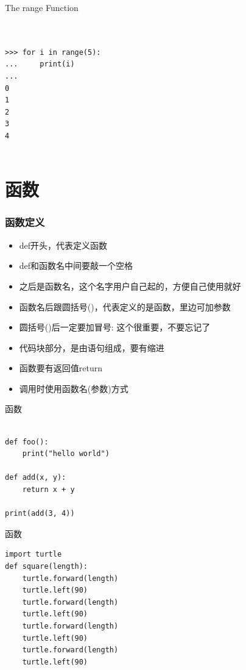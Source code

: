 \documentclass{beamer}
\begin{document}
\begin{frame}[t,fragile]{The range Function}


\begin{verbatim}


>>> for i in range(5):
...     print(i)
...
0
1
2
3
4


\end{verbatim}


\end{frame}

\section{函数} %
\label{sec:函数}

\begin{frame}
  \frametitle{函数定义}
	\begin{itemize}
		\item def开头，代表定义函数
		\item def和函数名中间要敲一个空格
		\item 之后是函数名，这个名字用户自己起的，方便自己使用就好
		\item 函数名后跟圆括号()，代表定义的是函数，里边可加参数
		\item 圆括号()后一定要加冒号: 这个很重要，不要忘记了
		\item 代码块部分，是由语句组成，要有缩进
		\item 函数要有返回值return
		\item 调用时使用函数名(参数)方式
	\end{itemize}
\end{frame}

\begin{frame}[t,fragile]{函数}


\begin{verbatim}

def foo():
    print("hello world")

def add(x, y):
    return x + y

print(add(3, 4))
\end{verbatim}


\end{frame}

\begin{frame}[t,fragile]{函数}
\begin{verbatim}
import turtle
def square(length):
    turtle.forward(length)
    turtle.left(90)
    turtle.forward(length)
    turtle.left(90)
    turtle.forward(length)
    turtle.left(90)
    turtle.forward(length)
    turtle.left(90)

\end{verbatim}
\end{frame}
\end{document}
